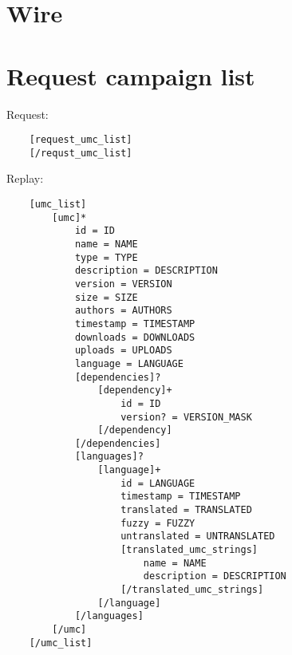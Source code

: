 \section{Wire}
\label{section:communication_protocol:wire}

\section{Request campaign list}
\label{wire:request_campaign_list}

Request:
\begin{lstlisting}
	[request_umc_list]
	[/requst_umc_list]
\end{lstlisting}

Replay:
\begin{lstlisting}
	[umc_list]
		[umc]*
			id = ID
			name = NAME
			type = TYPE
			description = DESCRIPTION
			version = VERSION
			size = SIZE
			authors = AUTHORS
			timestamp = TIMESTAMP
			downloads = DOWNLOADS
			uploads = UPLOADS
			language = LANGUAGE
			[dependencies]?
				[dependency]+
					id = ID
					version? = VERSION_MASK
				[/dependency]
			[/dependencies]
			[languages]?
				[language]+
					id = LANGUAGE
					timestamp = TIMESTAMP
					translated = TRANSLATED
					fuzzy = FUZZY
					untranslated = UNTRANSLATED
					[translated_umc_strings]
						name = NAME
						description = DESCRIPTION
					[/translated_umc_strings]
				[/language]
			[/languages]
		[/umc]
	[/umc_list]
\end{lstlisting}

